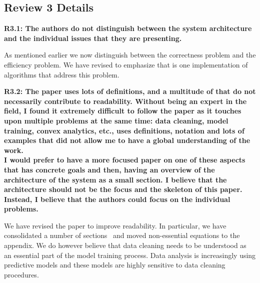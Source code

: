 \vspace{0.5em}


\subsection*{Review 3 Details}
\noindent\textbf{R3.1: The authors do not distinguish between the system architecture and the individual issues that they are presenting.}


As mentioned earlier we now distinguish between the correctness problem and the efficiency problem.
We have revised to emphasize that \sys is one implementation of algorithms that address this problem.

\vspace{0.5em}

\noindent\textbf{R3.2: The paper uses lots of definitions, and a multitude of that do not necessarily contribute to readability.
Without being an expert in the field, I found it extremely difficult to follow the paper as it touches upon multiple problems at the same time: data cleaning, model training, convex analytics, etc., uses definitions, notation and lots of examples that did not allow me to have a global understanding of the work.\\
I would prefer to have a more focused paper on one of these aspects that has concrete goals and then, having an overview of the architecture of the system as a small section. I believe that the architecture should not be the focus and the skeleton of this paper. Instead, I believe that the authors could focus on the individual problems.}



We have revised the paper to improve readability. In particular, we have consolidated a number of sections~ and moved non-essential equations to the appendix. We do however believe that data cleaning needs to be understood as an essential part of the model training process. Data analysis is increasingly using predictive models and these models are highly sensitive to data cleaning procedures.
